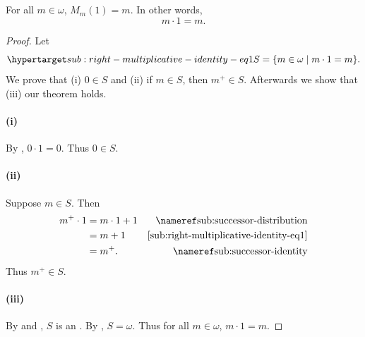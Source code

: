 \documentclass{report}
\begin{document}
\subsection{}%

\begin{lemma}[7]

  For all $m \in \omega$, $M_m(1) = m$.
  In other words, $$m \cdot 1 = m.$$

\end{lemma}

\begin{proof}


  Let
    \begin{equation}
      \hyperlabel{sub:right-multiplicative-identity-eq1}
      S = \{m \in \omega \mid m \cdot 1 = m\}.
    \end{equation}
  We prove that (i) $0 \in S$ and (ii) if $m \in S$, then $m^+ \in S$.
  Afterwards we show that (iii) our theorem holds.

  \paragraph{(i)}%

    By , $0 \cdot 1 = 0$.
    Thus $0 \in S$.

  \paragraph{(ii)}%

    Suppose $m \in S$.
    Then
      \begin{align*}
        m^+ \cdot 1
          & = m \cdot 1 + 1 & \textref{sub:successor-distribution} \\
          & = m + 1 & \eqref{sub:right-multiplicative-identity-eq1} \\
          & = m^+. & \textref{sub:successor-identity}
      \end{align*}
    Thus $m^+ \in S$.

  \paragraph{(iii)}%

    By  and
      , $S$
      is an .
    By , $S = \omega$.
    Thus for all $m \in \omega$, $m \cdot 1 = m$.

\end{proof}
\end{document}
